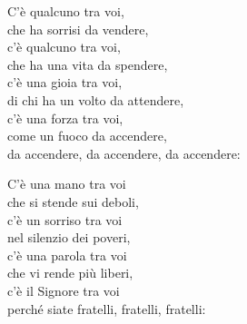 
\strofa C'è qualcuno tra voi,\\
che ha sorrisi da vendere,\\
c'è qualcuno tra voi,\\
che ha una vita da spendere,\\
c'è una gioia tra voi,\\
di chi ha un volto da attendere,\\
c'è una forza tra voi,\\
come un fuoco da accendere,\\
da accendere, da accendere, da accendere:

\spazio


\spazio

\strofa C'è una mano tra voi\\
che si stende sui deboli,\\
c'è un sorriso tra voi\\
nel silenzio dei poveri,\\
c'è una parola tra voi\\
che vi rende più liberi,\\
c'è il Signore tra voi\\
perché siate fratelli, fratelli, fratelli:

\spazio

